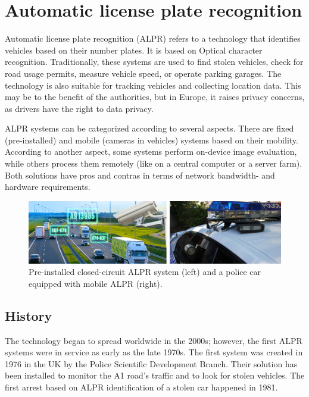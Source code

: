 \chapter{Automatic license plate recognition}

Automatic license plate recognition (ALPR) refers to a technology that identifies vehicles based on their number plates. It is based on Optical character recognition. Traditionally, these systems are used to find stolen vehicles, check for road usage permits, measure vehicle speed, or operate parking garages. The technology is also suitable for tracking vehicles and collecting location data. This may be to the benefit of the authorities, but in Europe, it raises privacy concerns, as drivers have the right to data privacy.

ALPR systems can be categorized according to several aspects. There are fixed (pre-installed) and mobile (cameras in vehicles) systems based on their mobility. According to another aspect, some systems perform on-device image evaluation, while others process them remotely (like on a central computer or a server farm). Both solutions have pros and contras in terms of network bandwidth- and hardware requirements.

\begin{figure}[htb]
 \centerline{\includegraphics[width=1.0\columnwidth]{.//Figure/ALPR/alpr-systems.png}}
 \caption{Pre-installed closed-circuit ALPR system\cite{ImageFixedALPR} (left) and a police car equipped with mobile ALPR\cite{ImageMobileALPR} (right).}
 \label{fig:simple}
\end{figure}

\section{History}

The technology began to spread worldwide in the 2000s; however, the first ALPR systems were in service as early as the late 1970s. The first system was created in 1976 in the UK by the Police Scientific Development Branch. Their solution has been installed to monitor the A1 road’s traffic and to look for stolen vehicles. The first arrest based on ALPR identification of a stolen car happened in 1981\cite{ANPR_history}.

